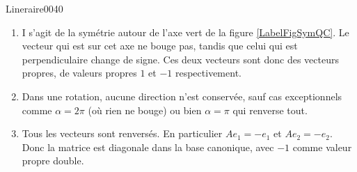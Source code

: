 \begin{corrige}{Lineraire0040}

	\begin{enumerate}

		\item
			
			I s'agit de la symétrie autour de l'axe vert de la figure \ref{LabelFigSymQC}. Le vecteur qui est sur cet axe ne bouge pas, tandis que celui qui est perpendiculaire change de signe. Ces deux vecteurs sont donc des vecteurs propres, de valeurs propres $1$ et $-1$ respectivement.
			\newcommand{\CaptionFigSymQC}{Sous la symétrie par rapport à l'axe, le vecteur sur l'axe ne bouge pas, et celui perpendiculaire change de signe.}
			

		\item
			Dans une rotation, aucune direction n'est conservée, sauf cas exceptionnels comme $\alpha=2\pi$ (où rien ne bouge) ou bien $\alpha=\pi$ qui renverse tout.

		\item
			Tous les vecteurs sont renversés. En particulier $Ae_1=-e_1$ et $Ae_2=-e_2$. Donc la matrice est diagonale dans la base canonique, avec $-1$ comme valeur propre double.

	\end{enumerate}
	


\end{corrige}
